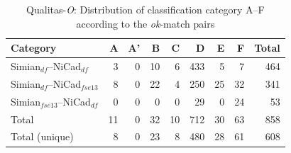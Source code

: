 \documentclass{sig-alternate-05-2015}
\begin{document}
\begin{table}
	\centering
	\caption{Qualitas-\textit{O}: Distribution of classification category A--F  according to the \textit{ok}-match pairs}
	\label{tab:ok_classification}
	\small
	\begin{tabular}{|l|r|r|r|r|r|r|r|r|}
		\hline 
		Category   																										& A   	& 	A' 	& 	B  & C	   & D   	&	E   &	F   & Total  \\
		\hline
		Simian$_{df}$--NiCad$_{df}$        & 3 	& 0 	& 10	& 6 	& 433  & 5	& 7  &  464 \\
		Simian$_{df}$--NiCad$_{fse13}$   									& 8 	& 0 	& 22	& 4	& 250 & 25  & 32 &  341 \\
		Simian$_{fse13}$--NiCad$_{df}$   									& 0 	& 0 	& 0 	& 0 	 & 29 	  & 0 		& 24 	& 53 \\
		\hline
		Total   &   11  &   0   &  32   &  10   &   712   &   30   & 63  & 858 \\
		Total (unique)  &   8  &   0   &  23   &  8   &  480  &  28  & 61  & 608 \\
		\hline
	\end{tabular} 
\end{table}

%
\end{document}
